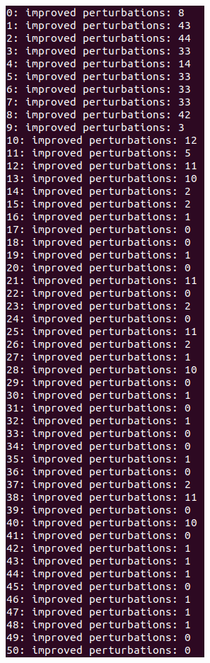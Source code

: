 \documentclass[12pt]{article}
\begin{document}
\newpage
\begin{figure}[H]
\centering
\begin{minipage}{.45\textwidth}
  \centering
  \includegraphics[width=.75\linewidth]{images/p1_sa2}

\end{minipage}
\end{figure}
\end{document}
